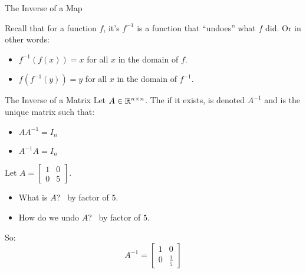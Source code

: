 \documentclass[xcoler=dvipsnames, aspectratio=169]{beamer}
\date{Matrix Inverses}
\begin{document}
    \begin{frame}{The Inverse of a Map}
        \begin{tcolorbox}
            Recall that for a function $f$, it's  $f^{-1}$ is a function
            that ``undoes'' what $f$ did. Or in other words:\pause
            \begin{itemize}
                \item $f^{-1}(f(x)) = x$ for all $x$ in the domain of $f$.\pause
                \item $f(f^{-1}(y)) = y$ for all $x$ in the domain of $f^{-1}$.\pause
            \end{itemize}
        \end{tcolorbox}
    \end{frame}
    \begin{frame}{The Inverse of a Matrix}
        Let $A\in\mathbb{R}^{n\times n}$. The  if it exists, is denoted $A^{-1}$ and
        is the unique matrix such that:\pause
        \begin{itemize}
            \item $AA^{-1} = I_n$\pause
            \item $A^{-1}A = I_n$\pause
        \end{itemize}
        \begin{example}
            Let $A = \begin{bmatrix}1 & 0 \\ 0 & 5\end{bmatrix}$.
            \begin{itemize}
                \item What is $A$?\pause\  by factor of $5$.\pause
                \item How do we undo $A$?\pause\  by factor of $5$.\pause
            \end{itemize}
            So:\pause
            \[
                A^{-1} = \begin{bmatrix}1 & 0\\0&\frac{1}{5}\end{bmatrix}
            \]
        \end{example}
    \end{frame}
\end{document}
